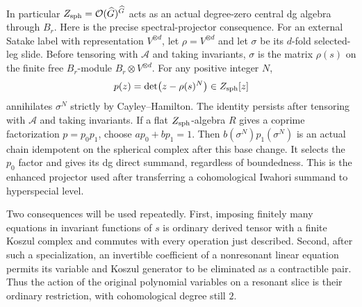 In particular $Z_{\rm sph}=\mathcal O(\widehat G)^{\widehat G}$ acts as an
actual degree-zero central dg algebra through $B_r$. Here is the
precise spectral-projector consequence. For an external Satake label
with representation $V^{\otimes d}$, let
$\rho=V^{\otimes d}$ and let $\sigma$ be its $d$-fold selected-leg
slide. Before tensoring with $\mathcal A$ and taking invariants,
$\sigma$ is the matrix $\rho(s)$ on the finite free $B_r$-module
$B_r\otimes V^{\otimes d}$. For any positive integer $N$,
\[
 p(z)=\det\bigl(z-\rho(s)^N\bigr)\in Z_{\rm sph}[z]
\]
annihilates $\sigma^N$ strictly by Cayley--Hamilton. The identity
persists after tensoring with $\mathcal A$ and taking invariants.
If a flat $Z_{\rm sph}$-algebra $R$ gives a coprime factorization
$p=p_0p_1$, choose $a p_0+b p_1=1$. Then
$b(\sigma^N)p_1(\sigma^N)$ is an actual chain idempotent on the
spherical complex after this base change. It selects the $p_0$
factor and gives its dg direct summand, regardless of boundedness.
This is the enhanced projector used after transferring a
cohomological Iwahori summand to hyperspecial level.

Two consequences will be used repeatedly. First, imposing
finitely many equations in invariant functions of $s$ is
ordinary derived tensor with a finite Koszul complex and
commutes with every operation just described. Second,
after such a specialization, an invertible coefficient
of a nonresonant linear equation permits its variable
and Koszul generator to be eliminated as a contractible
pair. Thus the action of the original polynomial
variables on a resonant slice is their ordinary
restriction, with cohomological degree still $2$.
